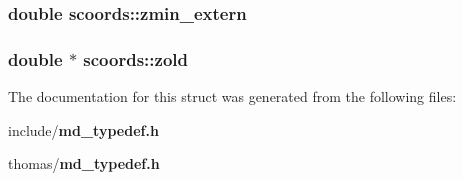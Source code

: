\subsubsection{\setlength{\rightskip}{0pt plus 5cm}double {\bf scoords::zmin\_\-extern}}\label{structscoords_8971273bd9463f53a7f5ba0cae2a5a02}


\subsubsection{\setlength{\rightskip}{0pt plus 5cm}double $\ast$ {\bf scoords::zold}}\label{structscoords_ad13d1ad9981a40ef0ae373957be02e6}




The documentation for this struct was generated from the following files:\begin{CompactItemize}
\item 
include/{\bf md\_\-typedef.h}\item 
thomas/{\bf md\_\-typedef.h}\end{CompactItemize}
